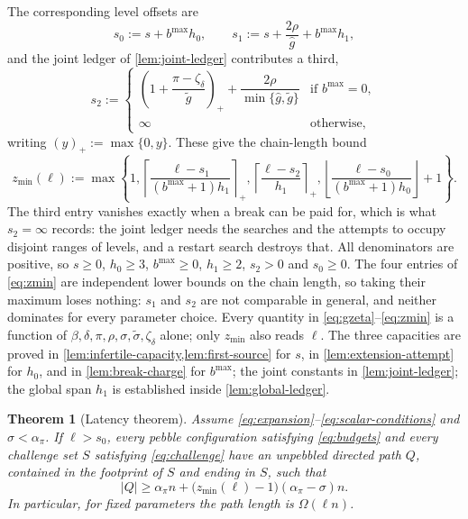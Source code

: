 \documentclass[11pt]{article}
\theoremstyle{plain}
\newtheorem{theorem}{Theorem}
\theoremstyle{remark}
\newcommand{\ghat}{\widehat g}
\newcommand{\gtilde}{\widetilde g}
\newcommand{\sigmatilde}{\widetilde{\sigma}}
\begin{document}
The corresponding level offsets are
\begin{equation}
 s_0:=s+b^{\max}h_0,\qquad
 s_1:=s+\frac{2\rho}{\ghat}+b^{\max}h_1 ,
 \label{eq:global-constants}
\end{equation}
and the joint ledger of \cref{lem:joint-ledger} contributes a third,
\begin{equation}
 s_2:=
 \begin{cases}
  \left(1+\dfrac{\pi-\zeta_\delta}{\gtilde}\right)_{\!+}
   +\dfrac{2\rho}{\min\{\ghat,\gtilde\}} & \text{if }b^{\max}=0,\\[2.5ex]
  \infty & \text{otherwise,}
 \end{cases}
 \label{eq:joint-constants}
\end{equation}
writing \((y)_+:=\max\{0,y\}\).  These give the chain-length bound
\begin{equation}
 z_{\min}(\ell):=\max\left\{1,
 \left\lceil\frac{\ell-s_1}{(b^{\max}+1)h_1}\right\rceil_+,
 \left\lceil\frac{\ell-s_2}{h_1}\right\rceil_+,
 \left\lfloor\frac{\ell-s_0}{(b^{\max}+1)h_0}\right\rfloor+1\right\}.
 \label{eq:zmin}
\end{equation}
The third entry vanishes exactly when a break can be paid for, which is what
\(s_2=\infty\) records: the joint ledger needs the searches and the attempts to occupy
disjoint ranges of levels, and a restart search destroys that.
All denominators are positive, so \(s\ge0\), \(h_0\ge3\),
\(b^{\max}\ge0\), \(h_1\ge2\), \(s_2>0\) and \(s_0\ge0\).
The four entries of \eqref{eq:zmin} are independent lower bounds on the chain length,
so taking their maximum loses nothing: \(s_1\) and \(s_2\) are not comparable
in general, and neither dominates for every parameter choice.  Every quantity in
\eqref{eq:gzeta}--\eqref{eq:zmin} is a function of
\(\beta,\delta,\pi,\rho,\sigma,\sigmatilde,\zeta_\delta\) alone; only \(z_{\min}\) also reads
\(\ell\).  The three capacities are proved in
\cref{lem:infertile-capacity,lem:first-source} for \(s\), in
\cref{lem:extension-attempt} for \(h_0\), and in \cref{lem:break-charge} for
\(b^{\max}\); the joint constants in \cref{lem:joint-ledger};
the global span \(h_1\) is established inside
\cref{lem:global-ledger}.

\begin{theorem}[Latency theorem]
\label{thm:latency}
Assume \eqref{eq:expansion}--\eqref{eq:scalar-conditions} and
\(\sigma<\alpha_\pi\).  If \(\ell>s_0\), every pebble configuration satisfying
\eqref{eq:budgets} and every challenge set \(S\) satisfying \eqref{eq:challenge} have
an unpebbled directed path \(Q\), contained in the footprint of \(S\) and ending in
\(S\), such that
\begin{equation}
 |Q|\ge \alpha_\pi n+
 \bigl(z_{\min}(\ell)-1\bigr)
 (\alpha_\pi-\sigma)n.
 \label{eq:main-path-length}
\end{equation}
In particular, for fixed parameters the path length is \(\Omega(\ell n)\).
\end{theorem}
\end{document}
